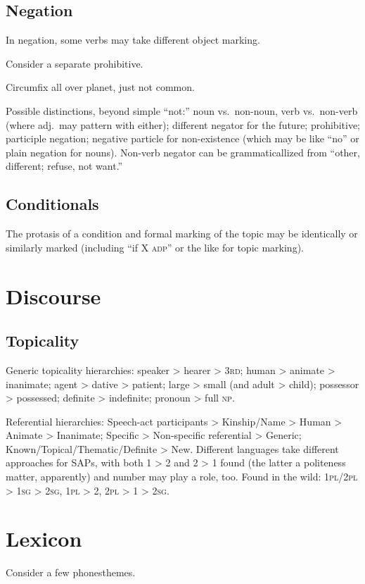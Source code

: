 \documentclass[11pt]{article}
\newcommand{\I}[1]{\textsc{#1}}   %
\begin{document}
\subsection{Negation}
In negation, some verbs may take different object marking.

Consider a separate prohibitive.

Circumfix all over planet, just not common.

Possible distinctions, beyond simple ``not:'' noun vs.\ non-noun, verb
vs.\ non-verb (where adj.\ may pattern with either); different negator
for the future; prohibitive; participle negation; negative particle
for non-existence (which may be like ``no'' or plain negation for
nouns).  Non-verb negator can be grammaticallized from ``other,
different; refuse, not want.''


\subsection{Conditionals}
The protasis of a condition and formal marking of the topic may be
identically or similarly marked (including ``if X \I{adp}'' or the
like for topic marking).


\section{Discourse}

\subsection{Topicality}
Generic topicality hierarchies: speaker > hearer > \I{3rd}; human >
animate > inanimate; agent > dative > patient; large > small (and
adult > child); possessor > possessed; definite > indefinite; pronoun
> full \I{np}.

Referential hierarchies: Speech-act participants > Kinship/Name >
Human > Animate > Inanimate; Specific > Non-specific referential >
Generic; Known/Topical/Thematic/Definite > New.  Different languages
take different approaches for SAPs, with both 1 > 2 and 2 > 1 found
(the latter a politeness matter, apparently) and number may play a
role, too. Found in the wild: \I{1pl/2pl > 1sg > 2sg}, \I{1pl > 2},
\I{2pl > 1 > 2sg}.


\section{Lexicon}
Consider a few phonesthemes.
\end{document}
